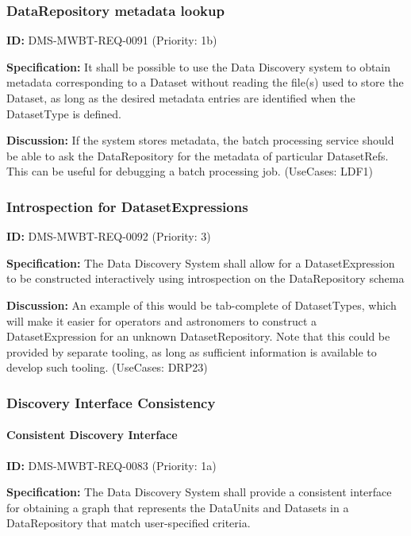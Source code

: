 \documentclass[SE,toc,lsstdraft]{lsstdoc}
\begin{document}
\subsubsection{DataRepository metadata lookup}

\label{DMS-MWBT-REQ-0091}
\textbf{ID:} DMS-MWBT-REQ-0091 (Priority: 1b)

\textbf{Specification:}
It shall be possible to use the Data Discovery system to obtain metadata corresponding to a Dataset without reading the file(s) used to store the Dataset, as long as the desired metadata entries are identified when the DatasetType is defined.

\textbf{Discussion:}
If the system stores metadata, the batch processing service should be able to ask the DataRepository for the metadata of particular DatasetRefs. This can be useful for debugging a batch processing job. (UseCases: LDF1)

\subsubsection{Introspection for DatasetExpressions}

\label{DMS-MWBT-REQ-0092}
\textbf{ID:} DMS-MWBT-REQ-0092 (Priority: 3)

\textbf{Specification:}
The Data Discovery System shall allow for a DatasetExpression to be constructed interactively using introspection on the DataRepository schema

\textbf{Discussion:}
An example of this would be tab-complete of DatasetTypes, which will make it easier for operators and astronomers to construct a DatasetExpression for an unknown DatasetRepository. Note that this could be provided by separate tooling, as long as sufficient information is available to develop such tooling. (UseCases: DRP23)

\subsubsection{Discovery Interface Consistency}

\paragraph{Consistent Discovery Interface}\hfill  %

\label{DMS-MWBT-REQ-0083}
\textbf{ID:} DMS-MWBT-REQ-0083 (Priority: 1a)

\textbf{Specification:}
The Data Discovery System shall provide a consistent interface for obtaining a graph that represents the DataUnits and Datasets in a DataRepository that match user-specified criteria.
\end{document}
